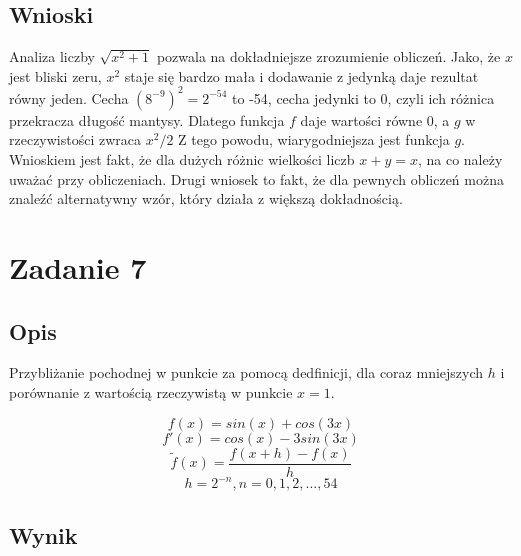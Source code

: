 \documentclass[12pt, letterpaper]{article}
\begin{document}
\subsection{Wnioski}

Analiza liczby $\sqrt{x^2 + 1}$ pozwala na dokładniejsze zrozumienie obliczeń.
Jako, że $x$ jest bliski zeru, $x^2$ staje się bardzo mała i dodawanie z jedynką
daje rezultat równy jeden. Cecha $(8^{-9})^2 = 2^{-54}$ to -54, cecha jedynki to 0,
czyli ich różnica przekracza długość mantysy.
Dlatego funkcja $f$ daje wartości równe 0, a $g$ w rzeczywistości zwraca $x^2 /
    2$
Z tego powodu, wiarygodniejsza jest funkcja $g$. 
Wnioskiem jest fakt, że dla dużych różnic wielkości liczb $x + y = x$, na co należy uważać przy obliczeniach.
Drugi wniosek to fakt, że dla pewnych obliczeń można znaleźć alternatywny wzór, który działa z większą dokładnością. 

\section{Zadanie 7}

\subsection{Opis}

Przybliżanie pochodnej w punkcie za pomocą dedfinicji, dla coraz mniejszych $h$
i porównanie z wartością rzeczywistą w punkcie $x = 1$.

\[ f(x) = sin(x) + cos(3 x) \]
\[ f'(x) = cos(x) - 3 sin(3 x) \]
\[ \widetilde{f} (x) = \frac{f(x + h) - f(x)}{h} \]
\[ h = 2^{-n}, n = 0, 1, 2,...,54 \]

\subsection{Wynik}
\end{document}
